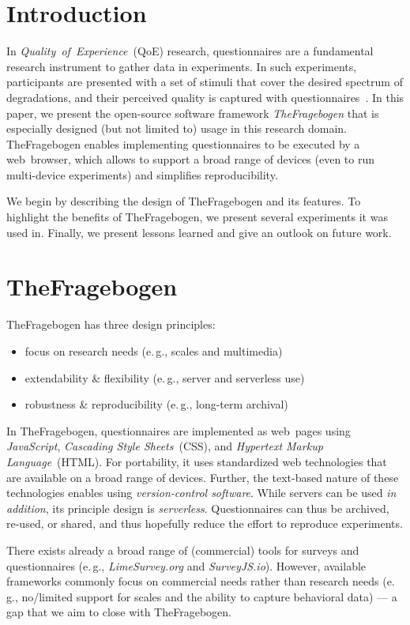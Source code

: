 \documentclass[conference,a4paper]{IEEEtran}
\newcommand{\eg}{e.\,g.}
\begin{document}
\section{Introduction}
In \emph{Quality~of~Experience}~(QoE) research, questionnaires are a fundamental research instrument to gather data in experiments.
In such experiments, participants are presented with a set of stimuli that cover the desired spectrum of degradations, and their perceived quality is captured with questionnaires~\cite{raake_quality_2014}.
In this paper, we present the open-source software framework
\emph{TheFragebogen} that is especially designed (but not limited to) usage in this research domain.
TheFragebogen enables implementing questionnaires to be executed by a web~browser, which allows to support a broad range of devices (even to run multi-device experiments) and simplifies reproducibility.

We begin by describing the design of TheFragebogen and its features.
To highlight the benefits of TheFragebogen, we present several experiments it was used in.
Finally, we present lessons learned and give an outlook on future work.

\section{TheFragebogen}\label{sec:thefragebogen}
TheFragebogen has three design principles:
\begin{itemize}
	\item focus on research needs (\eg, scales and multimedia)
	\item extendability \& flexibility (\eg, server and serverless use)
	\item robustness \& reproducibility (\eg, long-term archival)
\end{itemize}
In TheFragebogen, questionnaires are implemented as web~pages using \emph{JavaScript}, \emph{Cascading Style Sheets}~(CSS), and \emph{Hypertext Markup Language}~(HTML).
For portability, it uses standardized web technologies that are available on a broad range of devices.
Further, the text-based nature of these technologies enables using \emph{version-control software}.
While servers can be used \emph{in addition}, its principle design is \emph{serverless}.
Questionnaires can thus be archived, re-used, or shared, and thus hopefully reduce the effort to reproduce experiments.

There exists already a broad range of (commercial) tools for surveys and questionnaires (\eg, \emph{LimeSurvey.org} and \emph{SurveyJS.io}).
However, available frameworks commonly focus on commercial needs rather than research needs (\eg, no/limited support for scales and the ability to capture behavioral data) --- a gap that we aim to close with TheFragebogen.
\end{document}
